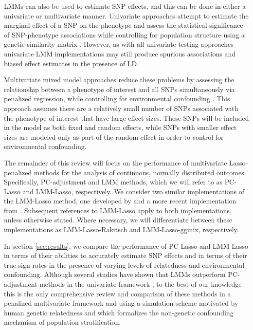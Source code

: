 LMMs can also be used to estimate SNP effects, and this can be done in either a univariate or multivariate manner. Univariate approaches attempt to estimate the marginal effect of a SNP on the phenotype and assess the statistical significance of SNP-phenotype associations while controlling for population structure using a genetic similarity matrix \citep{yu2006unified, kang2010variance, kang2008efficient}. However, as with all univariate testing approaches univariate LMM implementations may still produce spurious associations and biased effect estimates in the presence of LD. 

Multivariate mixed model approaches reduce these problems by assessing the relationship between a phenotype of interest and all SNPs simultaneously via penalized regression, while controlling for environmental confounding  \citep{Rakitsch2012, bhatnagar2019simultaneous}. This approach assumes there are a relatively small number of SNPs associated with the phenotype of interest that have large effect sizes. These SNPs will be included in the model as both fixed and random effects, while SNPs with smaller effect sizes are modeled only as part of the random effect in order to control for environmental confounding. 

The remainder of this review will focus on the performance of multivariate Lasso-penalized methods for the analysis of continuous, normally distributed outcomes. Specifically, PC-adjustment and LMM methods, which we will refer to as PC-Lasso and LMM-Lasso, respectively. We consider two similar implementations of the LMM-Lasso method, one developed by \citep{Rakitsch2012} and a more recent implementation from \citep{bhatnagar2019simultaneous}. Subsequent references to LMM-Lasso apply to both implementations, unless otherwise stated. Where necessary, we will differentiate between these implementations as LMM-Lasso-Rakitsch and LMM-Lasso-ggmix, respectively. 

In section \ref{sec:results}, we compare the performance of PC-Lasso and LMM-Lasso in terms of their abilities to accurately estimate SNP effects and in terms of their true sign rates in the presence of varying levels of relatedness and environmental confounding. Although several studies have shown that LMMs outperform PC-adjustment methods in the univariate framework \citep{wang2013analytical, kang2010variance, zhao2007arabidopsis}, to the best of our knowledge this is the only comprehensive review and comparison of these methods in a penalized multivariate framework and using a simulation scheme motivated by human genetic relatedness and which formalizes the non-genetic confounding mechanism of population stratification.\\

